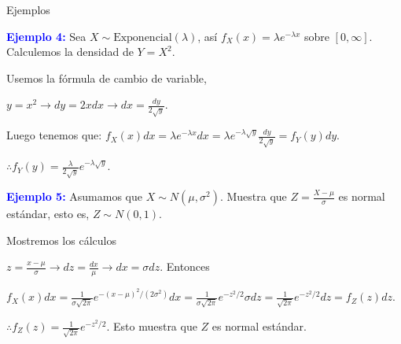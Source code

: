 \documentclass[10pt]{beamer}
\begin{document}
\begin{frame}{Ejemplos}
\small{ \textcolor{blue}{\textbf{Ejemplo 4:}} Sea $X \sim \text{Exponencial}(\lambda)$, as\'i $f_X(x) = \lambda e^{-\lambda x}$ sobre $[0, \infty]$. Calculemos la densidad de $Y = X^2$.
	
Usemos la f\'ormula de cambio de variable,

$y = x^2 \rightarrow dy = 2x dx \rightarrow dx = \frac{dy}{2\sqrt{y}}$. 

Luego tenemos que:  $f_X(x)dx = \lambda e^{-\lambda x}dx = \lambda e^{-\lambda \sqrt{y}}\frac{dy}{2\sqrt{y}} = f_Y(y)dy$.

$\therefore f_Y(y) = \frac{\lambda }{2\sqrt{y}}e^{-\lambda \sqrt{y}}$.  


\textcolor{blue}{\textbf{Ejemplo 5:}} Asumamos que $X \sim N(\mu, \sigma^2)$. Muestra que $Z = \frac{X - \mu}{\sigma}$ es normal est\'andar, esto es, $Z \sim N(0,1)$.

Mostremos los c\'alculos

\qquad \qquad $z = \frac{x - \mu}{\sigma } \rightarrow dz = \frac{dx}{\mu} \rightarrow dx  = \sigma dz$. Entonces

$f_X(x)dx = \frac{1}{\sigma \sqrt{2\pi}}e^{-(x - \mu)^2/(2\sigma^2)} dx = \frac{1}{\sigma \sqrt{2\pi}}e^{-z^2/2}\sigma dz =  \frac{1}{\sqrt{2\pi}}e^{-z^2/2} dz = f_Z(z)dz$.


$\therefore f_Z(z) = \frac{1}{\sqrt{2\pi}}e^{-z^2/2}$. Esto muestra que $Z$ es normal est\'andar.
}
\end{frame}
\end{document}
